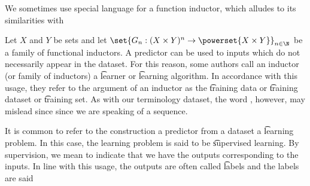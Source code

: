 

We sometimes use special language for a function inductor, which alludes to its similarities with 


Let $X$ and $Y$ be sets and let $\set{G_n: (X \times Y)^n \to \powerset{X \times Y}}_{n \in \N}$ be a family of functional inductors.
A predictor can be used to  inputs which do not necessarily appear in the dataset.
For this reason, some authors call an inductor (or family of inductors) a \t{learner} or \t{learning algorithm}.
In accordance with this usage, they refer to the argument of an inductor as the \t{training data} or \t{training dataset} or \t{training set}.
As with our terminology dataset, the word , however, may mislead since since we are speaking of a sequence.

It is common to refer to the construction a predictor from a dataset a \t{learning problem}.
In this case, the learning problem is said to be \t{supervised learning}.
By supervision, we mean to indicate that we have the outputs corresponding to the inputs.
In line with this usage, the outputs are often called \t{labels} and the labels are said 

\blankpage
